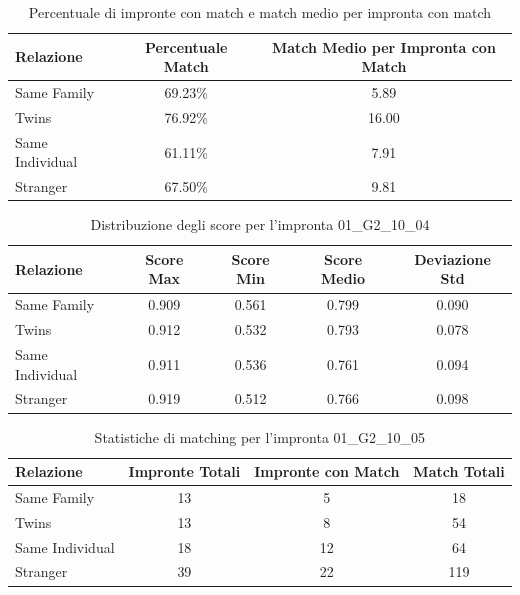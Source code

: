 \begin{table}[htbp]
\centering
\caption{Percentuale di impronte con match e match medio per impronta con match}
\label{tab:match_percentage_01_G2_10_04}
\begin{tabular}{|l|c|c|}
\hline
\textbf{Relazione} & \textbf{Percentuale Match} & \textbf{Match Medio per Impronta con Match} \\
\hline
Same Family & 69.23\% & 5.89 \\
\hline
Twins & 76.92\% & 16.00 \\
\hline
Same Individual & 61.11\% & 7.91 \\
\hline
Stranger & 67.50\% & 9.81 \\
\hline
\end{tabular}
\end{table}


\begin{table}[htbp]
\centering
\caption{Distribuzione degli score per l'impronta 01\_G2\_10\_04}
\label{tab:scores_01_G2_10_04}
\begin{tabular}{|l|c|c|c|c|}
\hline
\textbf{Relazione} & \textbf{Score Max} & \textbf{Score Min} & \textbf{Score Medio} & \textbf{Deviazione Std} \\
\hline
Same Family & 0.909 & 0.561 & 0.799 & 0.090 \\
\hline
Twins & 0.912 & 0.532 & 0.793 & 0.078 \\
\hline
Same Individual & 0.911 & 0.536 & 0.761 & 0.094 \\
\hline
Stranger & 0.919 & 0.512 & 0.766 & 0.098 \\
\hline
\end{tabular}
\end{table}


\begin{table}[htbp]
\centering
\caption{Statistiche di matching per l'impronta 01\_G2\_10\_05}
\label{tab:results_01_G2_10_05}
\begin{tabular}{|l|c|c|c|}
\hline
\textbf{Relazione} & \textbf{Impronte Totali} & \textbf{Impronte con Match} & \textbf{Match Totali} \\
\hline
Same Family & 13 & 5 & 18 \\
\hline
Twins & 13 & 8 & 54 \\
\hline
Same Individual & 18 & 12 & 64 \\
\hline
Stranger & 39 & 22 & 119 \\
\hline
\end{tabular}
\end{table}


